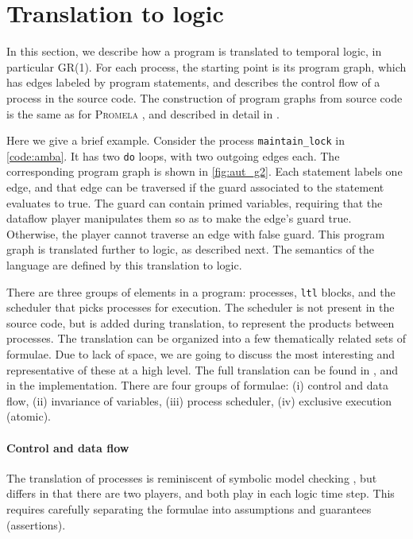 \documentclass[copyright]{eptcs}
\begin{document}
\section{Translation to logic}
\label{sec:translation-to-logic}

In this section, we describe how a program is translated to temporal logic, in particular GR(1).
For each process, the starting point is its program graph, which has edges labeled by program statements, and describes the control flow of a process in the source code.
The construction of program graphs from source code is the same as for \textsc{Promela} \cite{Holzmann03}, and described in detail in \cite{Filippidis15cds3-synt}.

Here we give a brief example.
Consider the process \texttt{maintain\_lock} in \cref{code:amba}.
It has two \texttt{do} loops, with two outgoing edges each.
The corresponding program graph is shown in \cref{fig:aut_g2}.
Each statement labels one edge, and that edge can be traversed if the guard associated to the statement evaluates to true.
The guard can contain primed variables, requiring that the dataflow player manipulates them so as to make the edge's guard true.
Otherwise, the player cannot traverse an edge with false guard.
This program graph is translated further to logic, as described next.
The semantics of the language are defined by this translation to logic.

There are three groups of elements in a program: processes, \texttt{ltl} blocks, and the scheduler that picks processes for execution.
The scheduler is not present in the source code, but is added during translation, to represent the products between processes.
The translation can be organized into a few thematically related sets of formulae.
Due to lack of space, we are going to discuss the most interesting and representative of these at a high level.
The full translation can be found in \cite{Filippidis15cds3-synt}, and in the implementation.
There are four groups of formulae:
(i) control and data flow,
(ii) invariance of variables,
(iii) process scheduler,
(iv) exclusive execution (atomic).


\paragraph{Control and data flow}

The translation of processes is reminiscent of symbolic model checking \cite{McMillan92phd}, but differs in that there are two players, and both play in each logic time step.
This requires carefully separating the formulae into assumptions and guarantees (assertions).
\end{document}
